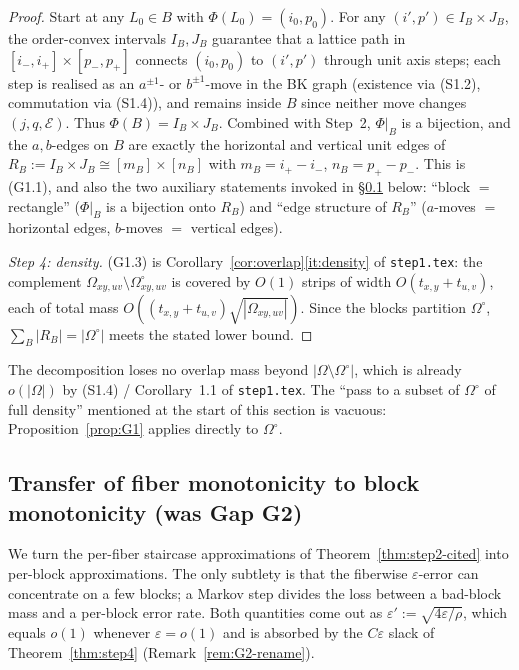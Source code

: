 \begin{proof}
Start at any $L_0\in B$ with $\Phi(L_0)=(i_0,p_0)$. For any
$(i',p')\in I_B\times J_B$, the order-convex intervals $I_B,J_B$
guarantee that a lattice path in $[i_-,i_+]\times[p_-,p_+]$ connects
$(i_0,p_0)$ to $(i',p')$ through unit axis steps; each step is
realised as an $a^{\pm 1}$- or $b^{\pm 1}$-move in the BK graph
(existence via (S1.2), commutation via (S1.4)), and remains inside
$B$ since neither move changes $(j,q,\mathcal E)$. Thus
$\Phi(B)=I_B\times J_B$. Combined with Step~2, $\Phi|_B$ is a
bijection, and the $a,b$-edges on $B$ are exactly the horizontal and
vertical unit edges of
$R_B:=I_B\times J_B\cong[m_B]\times[n_B]$ with
$m_B=i_+-i_-$, $n_B=p_+-p_-$. This is (G1.1), and also the two
auxiliary statements invoked in \S\ref{subsec:G2-step4} below: ``block
$=$ rectangle'' ($\Phi|_B$ is a bijection onto $R_B$) and ``edge
structure of $R_B$'' ($a$-moves $=$ horizontal edges,
$b$-moves $=$ vertical edges).

\emph{Step 4: density.}
(G1.3) is Corollary~\ref{cor:overlap}\ref{it:density} of
\texttt{step1.tex}: the complement
$\Omega_{xy,uv}\setminus\Omega^\circ_{xy,uv}$ is covered by $O(1)$
strips of width $O(t_{x,y}+t_{u,v})$, each of total mass
$O((t_{x,y}+t_{u,v})\sqrt{|\Omega_{xy,uv}|})$. Since the blocks
partition $\Omega^\circ$, $\sum_B|R_B|=|\Omega^\circ|$ meets the
stated lower bound.
\end{proof}

\begin{remark}
The decomposition loses no overlap mass beyond
$|\Omega\setminus\Omega^\circ|$, which is already $o(|\Omega|)$ by
(S1.4) / Corollary~1.1 of \texttt{step1.tex}. The ``pass to a subset
of $\Omega^\circ$ of full density'' mentioned at the start of this
section is vacuous: Proposition~\ref{prop:G1} applies directly to
$\Omega^\circ$.
\end{remark}

\subsection{Transfer of fiber monotonicity to block monotonicity (was Gap G2)}
\label{subsec:G2-step4}

We turn the per-fiber staircase approximations of
Theorem~\ref{thm:step2-cited} into per-block approximations. The only
subtlety is that the fiberwise $\varepsilon$-error can concentrate on a
few blocks; a Markov step divides the loss between a bad-block mass
and a per-block error rate. Both quantities come out as
$\varepsilon':=\sqrt{4\varepsilon/\rho}$, which equals $o(1)$ whenever
$\varepsilon=o(1)$ and is absorbed by the $C\varepsilon$ slack of
Theorem~\ref{thm:step4} (Remark~\ref{rem:G2-rename}).

